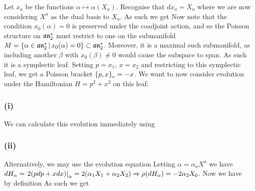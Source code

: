 \documentclass{article}
\begin{document}
Let $x_a$ be the functions $\alpha \mapsto \alpha(X_a)$. Recognise that $dx_a = X_a$ where we are now considering $X^a$ as the dual basis to $X_a$. As such we get 
Now note that the condition $x_0(\alpha)=0$ is preserved under the coadjoint action, and so the Poisson structure on $\mf{an}_2^\ast$ must restrict to one on the submanifold $M = \pbrace{\alpha \in \mf{an}_2^\ast \, | \, x_0(\alpha) = 0}\subset \mf{an}_2^\ast$. Moreover, it is a maximal such submanifold, as including another $\beta$ with $x_0(\beta) \neq 0$ would cause the subspace to span. As such it is a symplectic leaf. 
Setting $p= x_1, \, x = x_2$ and restricting to this symplectic leaf, we get a Poisson bracket $\acomm[p]{x}_r = -x$. We want to now consider evolution under the Hamiltonian $H = p^2 + x^2$ on this leaf:

\subsubsection{(i)}
We can calculate this evolution immediately using 

\subsubsection{(ii)}
Alternatively, we may use the evolution equation
Letting $\alpha = \alpha_a X^a$ we have  $dH_\alpha = \ev{2(pdp + xdx)}{\alpha} = 2(\alpha_1 X_1 + \alpha_2 X_2) \Rightarrow \rho(dH_\alpha) = -2\alpha_2 X_0$. Now we have by definition 
As such we get 
\end{document}
